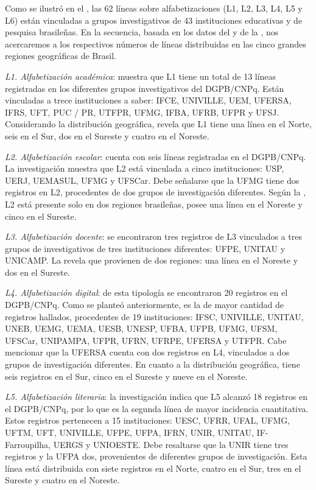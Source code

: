 \documentclass{textolivre}
\begin{document}
Como se ilustró en el , las 62 líneas sobre alfabetizaciones (L1, L2, L3, L4, L5 y L6) están vinculadas a grupos investigativos de 43 instituciones educativas y de pesquisa brasileñas. En la secuencia, basada en los datos del  y de la , nos acercaremos a los respectivos números de líneas distribuidas en las cinco grandes regiones geográficas de Brasil.

\textit{L1. Alfabetización académica}:  muestra que L1 tiene un total de 13 líneas registradas en los diferentes grupos investigativos del DGPB/CNPq. Están vinculadas a trece instituciones a saber: IFCE, UNIVILLE, UEM, UFERSA, IFRS, UFT, PUC / PR, UTFPR, UFMG, IFBA, UFRB, UFPR y UFSJ. Considerando la distribución geográfica,  revela que L1 tiene una línea en el Norte, seis en el Sur, dos en el Sureste y cuatro en el Noreste.

\textit{L2. Alfabetización escolar}: cuenta con seis líneas registradas en el DGPB/CNPq. La investigación muestra que L2 está vinculada a cinco instituciones: USP, UERJ, UEMASUL, UFMG y UFSCar. Debe señalarse que la UFMG tiene dos registros en L2, procedentes de dos grupos de investigación diferentes. Según la , L2 está presente solo en dos regiones brasileñas, posee una línea en el Noreste y cinco en el Sureste. 

\textit{L3. Alfabetización docente}: se encontraron tres registros de L3 vinculados a tres grupos de investigativos de tres instituciones diferentes: UFPE, UNITAU y UNICAMP. La  revela que provienen de dos regiones: una línea en el Noreste y dos en el Sureste.

\textit{L4. Alfabetización digital}: de esta tipología se encontraron 20 registros en el DGPB/CNPq. Como se planteó anteriormente, es la de mayor cantidad de registros hallados, procedentes de 19 instituciones: IFSC, UNIVILLE, UNITAU, UNEB, UEMG, UEMA, UESB, UNESP, UFBA, UFPB, UFMG, UFSM, UFSCar, UNIPAMPA, UFPR, UFRN, UFRPE, UFERSA y UTFPR. Cabe mencionar que la UFERSA cuenta con dos registros en L4, vinculados a dos grupos de investigación diferentes. En cuanto a la distribución geográfica, tiene seis registros en el Sur, cinco en el Sureste y nueve en el Noreste.

\textit{L5. Alfabetización literaria}: la investigación indica que L5 alcanzó 18 registros en el DGPB/CNPq, por lo que es la segunda línea de mayor incidencia cuantitativa. Estos registros pertenecen a 15 instituciones: UESC, UFRR, UFAL, UFMG, UFTM, UFT, UNIVILLE, UFPE, UFPA, IFRN, UNIR, UNITAU, IF-Farroupilha, UERGS y UNIOESTE. Debe resaltarse que la UNIR tiene tres registros y la UFPA dos, provenientes de diferentes grupos de investigación.  Esta línea está distribuida con siete registros en el Norte, cuatro en el Sur, tres en el Sureste y cuatro en el Noreste. 
\end{document}
